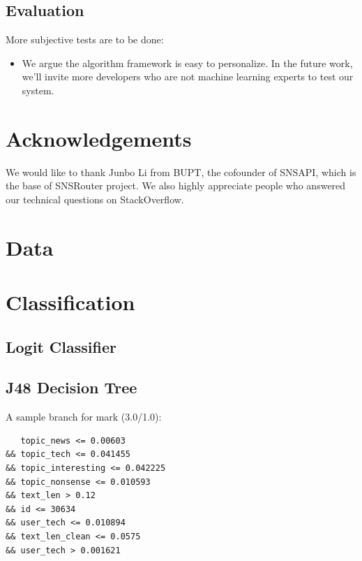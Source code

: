 \documentclass{sig-alternate}
\begin{document}
\subsection{Evaluation}
\label{sec:fu_Evaluation}

More subjective tests are to be done:

\begin{itemize}
	\item We argue the algorithm framework is easy to personalize. 
		In the future work, we'll invite more developers 
		who are not machine learning experts to test our system. 
\end{itemize}

\section*{Acknowledgements}
\label{sec:Acknowledgements}

We would like to thank Junbo Li from BUPT, 
the cofounder of SNSAPI, 
which is the base of SNSRouter project. 
We also highly appreciate people who answered our 
technical questions on StackOverflow. 




\appendix 

\section{Data}
\label{sec:Data}

\section{Classification}
\label{sec:app_Classification}

\subsection{Logit Classifier}
\label{sec:Logit Classifier}

\subsection{J48 Decision Tree}
\label{sec:J48 Decision Tree}

A sample branch for mark (3.0/1.0):

\begin{Verbatim}
   topic_news <= 0.00603 
&& topic_tech <= 0.041455
&& topic_interesting <= 0.042225 
&& topic_nonsense <= 0.010593 
&& text_len > 0.12 
&& id <= 30634 
&& user_tech <= 0.010894 
&& text_len_clean <= 0.0575
&& user_tech > 0.001621
\end{Verbatim}
\end{document}
